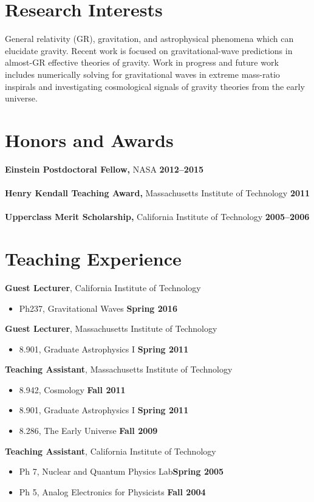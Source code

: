 \documentclass[margin,line]{res}
\begin{document}
\begin{resume}
\section{\sc Research Interests}
General relativity (GR), gravitation, and astrophysical phenomena which can
elucidate gravity. Recent work is focused on gravitational-wave predictions
in almost-GR effective theories of gravity. Work in progress and
future work includes numerically solving for gravitational waves in
extreme mass-ratio inspirals and investigating cosmological
signals of gravity theories from the early universe.

\section{\sc Honors and Awards}
{\bf Einstein Postdoctoral Fellow,} NASA \hfill {\bf 2012--2015}\\
\\
{\bf Henry Kendall Teaching Award,} Massachusetts Institute of Technology \hfill {\bf 2011}\\
\\
{\bf Upperclass Merit Scholarship,} California Institute of Technology \hfill {\bf 2005--2006}\\

\section{\sc Teaching Experience}
{\bf Guest Lecturer}, California Institute of Technology
\vspace*{.05in}
\begin{itemize}
\item[ ] Ph237, Gravitational Waves \hfill {\bf Spring 2016}
\end{itemize}
{\bf Guest Lecturer}, Massachusetts Institute of Technology
\vspace*{.05in}  
\begin{itemize}
\item[ ] 8.901, Graduate Astrophysics I \hfill {\bf Spring 2011}
\end{itemize}
{\bf Teaching Assistant}, Massachusetts Institute of Technology
\vspace*{.05in}
\begin{itemize}
\item[ ] 8.942, Cosmology \hfill {\bf Fall 2011}
\item[ ] 8.901, Graduate Astrophysics I \hfill {\bf Spring 2011}
\item[ ] 8.286, The Early Universe \hfill {\bf Fall 2009}
\end{itemize}
{\bf Teaching Assistant}, California Institute of Technology
\vspace*{.05in}
\begin{itemize}
\item[ ] Ph 7, Nuclear and Quantum Physics Lab\hfill {\bf Spring 2005}
\item[ ] Ph 5, Analog Electronics for Physicists \hfill {\bf Fall 2004}
\end{itemize}


\end{resume}
\end{document}
